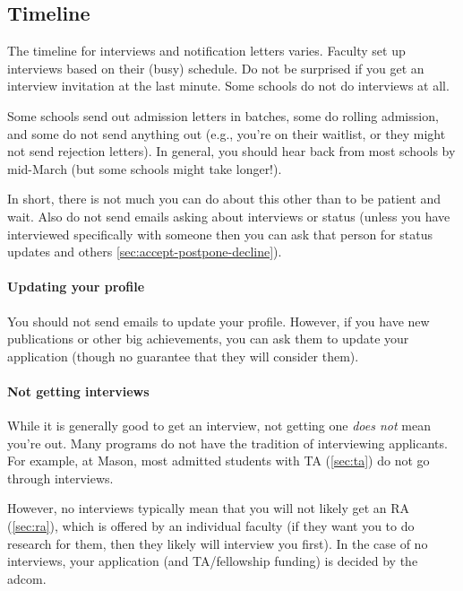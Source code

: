 \documentclass[oneside,11pt,dvipsnames]{book}
\begin{document}
\subsection{Timeline} 

The timeline for interviews and notification letters varies.  Faculty set up interviews based on their (busy) schedule. Do not be surprised if you get an interview invitation at the last minute. Some schools do not do interviews at all.

Some schools send out admission letters in batches, some do rolling admission, and some do not send anything out (e.g., you're on their waitlist, or they might not send rejection letters).  In general, you should hear back from most schools by mid-March (but some schools might take longer!).

In short, there is not much you can do about this other than to be patient and wait. Also do not send emails asking about interviews or status (unless you have interviewed specifically with someone then you can ask that person for status updates and others \autoref{sec:accept-postpone-decline}).

\paragraph{Updating your profile} You should not send emails to update your profile.  However, if you have new publications or other big achievements, you can ask them to update your application (though no guarantee that they will consider them).

\paragraph{Not getting interviews} While it is generally good to get an interview, not getting one \emph{does not} mean you're out.  Many programs do not have the tradition of interviewing applicants. For example, at Mason, most admitted students with TA (\autoref{sec:ta}) do not go through interviews.

However, no interviews typically mean that you will not likely get an RA (\autoref{sec:ra}), which is offered by an individual faculty (if they want you to do research for them, then they likely will interview you first).  In the case of no interviews, your application (and TA/fellowship funding) is decided by the adcom.

\end{document}
